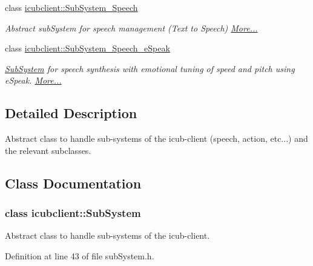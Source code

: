 \begin{DoxyCompactItemize}
class \hyperlink{group__icubclient__subsystems_classicubclient_1_1SubSystem__Speech}{icubclient\+::\+Sub\+System\+\_\+\+Speech}
\begin{DoxyCompactList}\small\item\em Abstract sub\+System for speech management (Text to Speech)  \hyperlink{group__icubclient__subsystems_classicubclient_1_1SubSystem__Speech}{More...}\end{DoxyCompactList}\item 
class \hyperlink{group__icubclient__subsystems_classicubclient_1_1SubSystem__Speech__eSpeak}{icubclient\+::\+Sub\+System\+\_\+\+Speech\+\_\+e\+Speak}
\begin{DoxyCompactList}\small\item\em \hyperlink{group__icubclient__subsystems_classicubclient_1_1SubSystem}{Sub\+System} for speech synthesis with emotional tuning of speed and pitch using e\+Speak.  \hyperlink{group__icubclient__subsystems_classicubclient_1_1SubSystem__Speech__eSpeak}{More...}\end{DoxyCompactList}\end{DoxyCompactItemize}


\subsection{Detailed Description}
Abstract class to handle sub-\/systems of the icub-\/client (speech, action, etc...) and the relevant subclasses. 



\subsection{Class Documentation}
\label{classicubclient_1_1SubSystem}
\subsubsection{class icubclient\+:\+:Sub\+System}
Abstract class to handle sub-\/systems of the icub-\/client. 

Definition at line 43 of file sub\+System.\+h.



